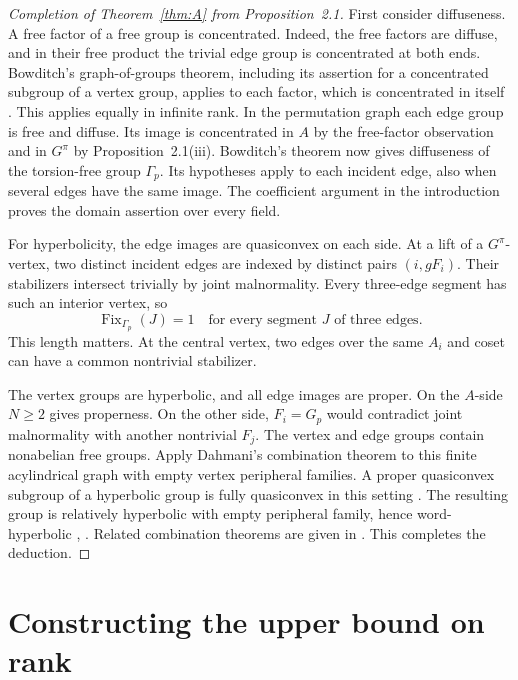 \documentclass[11pt,a4paper]{article}
\numberwithin{equation}{section}
\begin{document}
\begin{proof}[Completion of Theorem~\ref{thm:A} from Proposition~2.1]
First consider diffuseness. A free factor of a free group is
concentrated. Indeed, the free factors are diffuse, and in their
free product the trivial edge group is concentrated at both ends.
Bowditch's graph-of-groups theorem, including its assertion for a
concentrated subgroup of a vertex group, applies to each factor,
which is concentrated in itself
\cite[Theorems 1.2(3) and 1.3(2)]{r6}. This applies equally in
infinite rank. In the permutation graph each edge group is free and
diffuse. Its image is concentrated in \(A\) by the free-factor
observation and in \(G^\pi\) by Proposition~2.1(iii). Bowditch's
theorem now gives diffuseness of the torsion-free group \(\Gamma_p\).
Its hypotheses apply to each incident edge, also when several
edges have the same image. The coefficient argument in the
introduction proves the domain assertion over every field.

For hyperbolicity, the edge images are quasiconvex on each side.
At a lift of a \(G^\pi\)-vertex, two distinct incident edges are
indexed by distinct pairs \((i,gF_i)\). Their stabilizers intersect
trivially by joint malnormality. Every three-edge segment has such
an interior vertex, so
\begin{equation}\label{eq:perm-acylindrical}
 \operatorname{Fix}_{\Gamma_p}(J)=1
 \quad\text{for every segment \(J\) of three edges}.
\end{equation}
This length matters. At the central vertex, two edges over the
same \(A_i\) and coset can have a common nontrivial stabilizer.

The vertex groups are hyperbolic, and all edge images are proper.
On the \(A\)-side \(N\ge2\) gives properness. On the other side,
\(F_i=G_p\) would contradict joint malnormality with another
nontrivial \(F_j\). The vertex and edge groups contain nonabelian
free groups. Apply Dahmani's combination theorem to this finite
acylindrical graph with empty vertex peripheral families. A proper
quasiconvex subgroup of a hyperbolic group is fully quasiconvex in
this setting \cite[Proposition 1.11]{r8}. The resulting group is
relatively hyperbolic with empty peripheral family, hence
word-hyperbolic \cite[Theorem 0.1(1)]{r8}, \cite[Theorem 0.1]{r5}.
Related combination theorems are given in \cite{r2,r3,r15}.
This completes the deduction.
\end{proof}

\section{Constructing the upper bound on rank}
\end{document}
